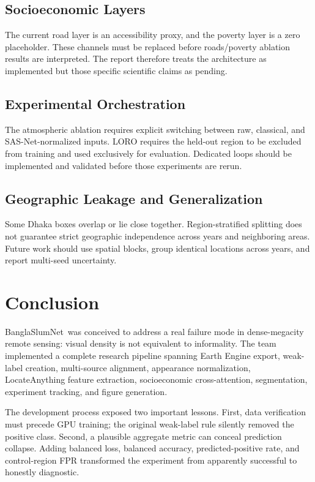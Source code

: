 \documentclass[11pt,a4paper]{article}
\newcommand{\project}{BanglaSlumNet}
\begin{document}
\subsection{Socioeconomic Layers}

The current road layer is an accessibility proxy, and the poverty layer is a zero placeholder. These channels must be replaced before roads/poverty ablation results are interpreted. The report therefore treats the architecture as implemented but those specific scientific claims as pending.

\subsection{Experimental Orchestration}

The atmospheric ablation requires explicit switching between raw, classical, and SAS-Net-normalized inputs. LORO requires the held-out region to be excluded from training and used exclusively for evaluation. Dedicated loops should be implemented and validated before those experiments are rerun.

\subsection{Geographic Leakage and Generalization}

Some Dhaka boxes overlap or lie close together. Region-stratified splitting does not guarantee strict geographic independence across years and neighboring areas. Future work should use spatial blocks, group identical locations across years, and report multi-seed uncertainty.

\section{Conclusion}

\project\ was conceived to address a real failure mode in dense-megacity remote sensing: visual density is not equivalent to informality. The team implemented a complete research pipeline spanning Earth Engine export, weak-label creation, multi-source alignment, appearance normalization, LocateAnything feature extraction, socioeconomic cross-attention, segmentation, experiment tracking, and figure generation.

The development process exposed two important lessons. First, data verification must precede GPU training; the original weak-label rule silently removed the positive class. Second, a plausible aggregate metric can conceal prediction collapse. Adding balanced loss, balanced accuracy, predicted-positive rate, and control-region FPR transformed the experiment from apparently successful to honestly diagnostic.
\end{document}
